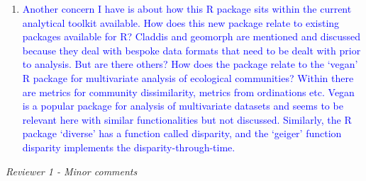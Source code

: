 \documentclass[12pt,letterpaper]{article}
\renewcommand{\subsection}[1]{%
\bigskip
\begin{center}
\begin{large}
\normalfont\itshape #1
\end{large}
\end{center}}
\begin{document}
\begin{enumerate}
\item{\textcolor{blue}{Another concern I have is about how this R package sits within the current analytical toolkit available.
How does this new package relate to existing packages available for R?
Claddis and geomorph are mentioned and discussed because they deal with bespoke data formats that need to be dealt with prior to analysis.
But are there others?
How does the package relate to the ‘vegan’ R package for multivariate analysis of ecological communities?
Within there are metrics for community dissimilarity, metrics from ordinations etc.
Vegan is a popular package for analysis of multivariate datasets and seems to be relevant here with similar functionalities but not discussed.
Similarly, the R package ‘diverse’ has a function called disparity, and the ‘geiger’ function disparity implements the disparity-through-time. }}


\end{enumerate}

\subsection{Reviewer 1 - Minor comments}
\end{document}
